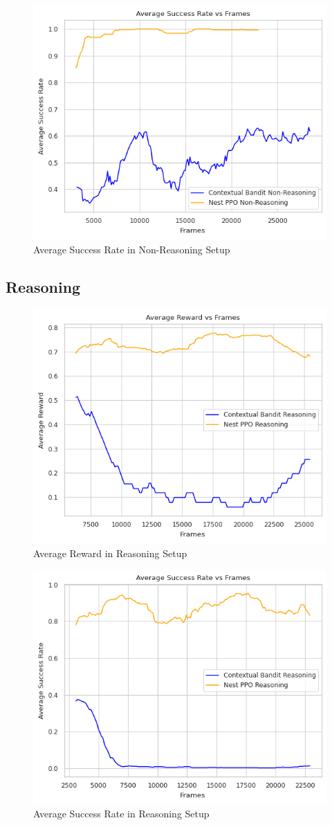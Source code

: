 \documentclass[11pt,a4paper]{article}
\begin{document}
\begin{figure}[htbp]
    \centering
    \includegraphics[width=0.6\linewidth]{../images/MC_TD_success_non_reasoning.png}
    \caption{Average Success Rate in Non-Reasoning Setup}
    \label{fig:mc_td_success_nonreasoning}
\end{figure}



\subsection{Reasoning}
\begin{figure}[htbp]
    \centering
    \includegraphics[width=0.6\linewidth]{../images/MC_TD_Reward_reasoning.png}
    \caption{Average Reward in Reasoning Setup}
    \label{fig:mc_td_reward_reasoning}
\end{figure}

\begin{figure}[htbp]
    \centering
    \includegraphics[width=0.6\linewidth]{../images/MC_TD_success_reasoning.png}
    \caption{Average Success Rate in Reasoning Setup}
    \label{fig:mc_td_success_reasoning}
\end{figure}
\end{document}
